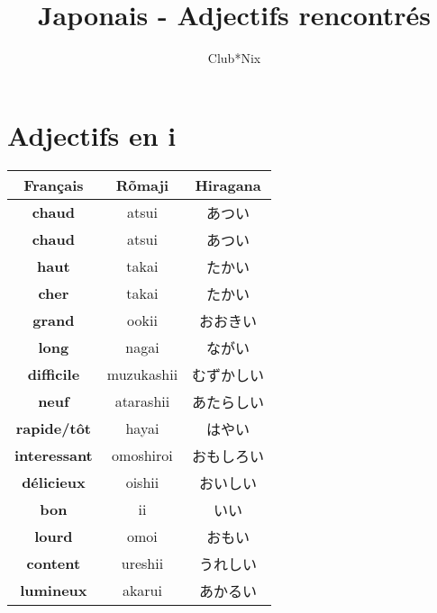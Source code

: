 \documentclass[11pt]{report}
\title{Japonais - Adjectifs rencontrés}
\author{
	Club*Nix
}
\newenvironment{Japanese}{%
\CJKfamily{min}%
\CJKtilde  
\CJKnospace}{}
\begin{document}
\maketitle
\tableofcontents

\chapter{Adjectifs en i}

\begin{CJK}{UTF8}{}  
\begin{Japanese}
	\begin{center}
		\begin{multicols}{2}
			\begin{tabular}{|c|c|c|}
				\hline
				\textbf{Français} & \textbf{Rõmaji} & \textbf{Hiragana} \\
				\hline
				\textbf{chaud} & atsui & あつい \\%
				\hline
				\textbf{chaud} & atsui & あつい \\%
				\hline
				\textbf{haut} & takai & たかい \\%
				\hline
				\textbf{cher} & takai & たかい \\%
				\hline
				\textbf{grand} & ookii & おおきい \\%
				\hline
				\textbf{long} & nagai & ながい \\%
				\hline
				\textbf{difficile} & muzukashii & むずかしい \\%
				\hline
				\textbf{neuf} & atarashii & あたらしい \\%
				\hline
				\textbf{rapide/t\^ot} & hayai & はやい \\%
				\hline
				\textbf{interessant} & omoshiroi & おもしろい \\%
				\hline
				\textbf{délicieux} & oishii & おいしい \\%
				\hline
				\textbf{bon} & ii & いい \\%
				\hline
				\textbf{lourd} & omoi & おもい \\%
				\hline
				\textbf{content} & ureshii & うれしい \\%
				\hline
				\textbf{lumineux} & akarui & あかるい \\%
				\hline


\end{tabular}
\end{multicols}
\end{center}
\end{Japanese}
\end{CJK}
\end{document}
